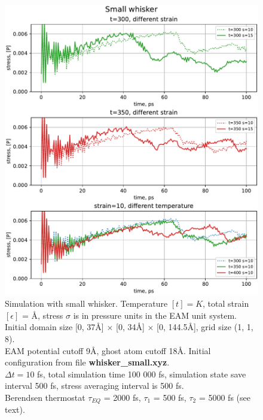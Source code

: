 \documentclass[12pt,a4paper]{article}
\begin{document}
\begin{figure}[h!]
	\centering
	\includegraphics[width=.95\linewidth]{img/milestone09-small.pdf}
	\caption{Simulation with small whisker. Temperature $[t]=K$, total strain $[\epsilon]$ = Å, stress $\sigma$ is in pressure units in the EAM unit system.\\
	Initial domain size [0, 37Å] $\times$ [0, 34Å] $\times$ [0, 144.5Å], grid size (1, 1, 8).\\
	EAM potential cutoff 9Å, ghost atom cutoff 18Å. Initial configuration from file {\bf whisker\_small.xyz}.\\
	$\Delta t = 10$ fs, total simulation time 100 000 fs, simulation state save interval 500 fs, stress averaging interval is 500 fs.\\
	Berendsen thermostat $\tau_{EQ}$ = 2000 fs, $\tau_1$ = 500 fs, $\tau_2$ = 5000 fs (see text).
	}
	\label{fig:whisker-small}
\end{figure}
\end{document}
